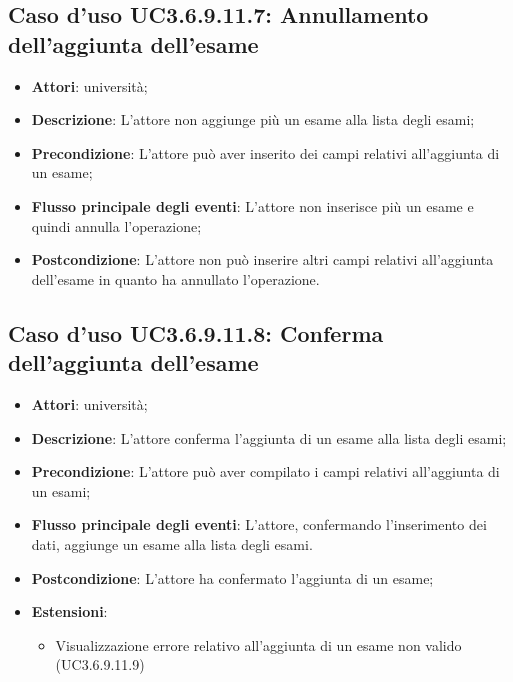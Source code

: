\subsection{Caso d'uso \texorpdfstring{UC3.6.9.11.7}{UC3.6.9.11.7}: Annullamento dell’aggiunta dell’esame}
\begin{itemize}
\item \textbf{Attori}: università;
\item \textbf{Descrizione}: L'attore non aggiunge più un esame alla lista degli esami;

\item \textbf{Precondizione}: L'attore può aver inserito dei campi relativi all'aggiunta di un esame;

\item \textbf{Flusso principale degli eventi}: L'attore non inserisce più un esame e quindi annulla l'operazione;

\item \textbf{Postcondizione}: L'attore non può inserire altri campi relativi all'aggiunta dell'esame in quanto ha annullato l'operazione.

\end{itemize}
\subsection{Caso d'uso \texorpdfstring{UC3.6.9.11.8}{UC3.6.9.11.8}: Conferma dell’aggiunta dell’esame}
\begin{itemize}
\item \textbf{Attori}: università;
\item \textbf{Descrizione}: L'attore conferma l'aggiunta di un esame alla lista degli esami;

\item \textbf{Precondizione}: L'attore può aver compilato i campi relativi all'aggiunta di un esami;

\item \textbf{Flusso principale degli eventi}: L'attore, confermando l'inserimento dei dati, aggiunge un esame alla lista degli esami.

\item \textbf{Postcondizione}: L'attore ha confermato l'aggiunta di un esame;

\item \textbf{Estensioni}:
\begin{itemize}
\item Visualizzazione errore relativo all’aggiunta di un esame non valido (UC3.6.9.11.9)
\end{itemize}
\end{itemize}
